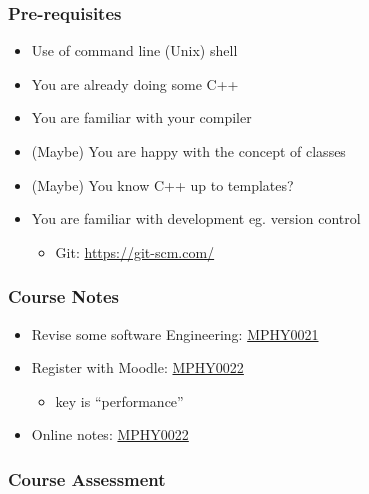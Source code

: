 \subsubsection{Pre-requisites}\label{pre-requisites}

\begin{itemize}
\itemsep1pt\parskip0pt
\item
  Use of command line (Unix) shell
\item
  You are already doing some C++
\item
  You are familiar with your compiler
\item
  (Maybe) You are happy with the concept of classes
\item
  (Maybe) You know C++ up to templates?
\item
  You are familiar with development eg. version control

  \begin{itemize}
  \itemsep1pt\parskip0pt
  \item
    Git: \url{https://git-scm.com/}
  \end{itemize}
\end{itemize}

\subsubsection{Course Notes}\label{course-notes}

\begin{itemize}
\itemsep1pt\parskip0pt
\item
  Revise some software Engineering:
  \href{http://github-pages.ucl.ac.uk/rsd-engineeringcourse/}{MPHY0021}
\item
  Register with Moodle: \href{https://moodle.ucl.ac.uk/}{MPHY0022}

  \begin{itemize}
  \itemsep1pt\parskip0pt
  \item
    key is ``performance''
  \end{itemize}
\item
  Online notes:
  \href{http://rits.github-pages.ucl.ac.uk/research-computing-with-cpp/}{MPHY0022}
\end{itemize}

\subsubsection{Course Assessment}\label{course-assessment}

